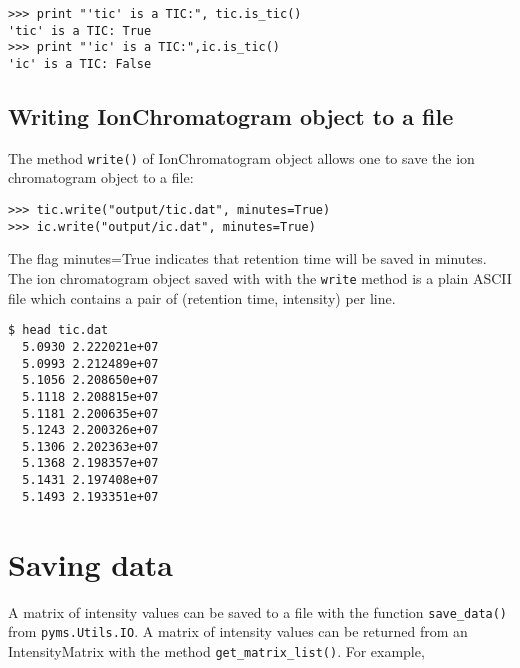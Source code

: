 \begin{verbatim}
>>> print "'tic' is a TIC:", tic.is_tic()
'tic' is a TIC: True
>>> print "'ic' is a TIC:",ic.is_tic()
'ic' is a TIC: False
\end{verbatim}

\subsection{Writing IonChromatogram object to a file}


The method {\tt write()} of IonChromatogram object allows one to save
the ion chromatogram object to a file:

\begin{verbatim}
>>> tic.write("output/tic.dat", minutes=True)
>>> ic.write("output/ic.dat", minutes=True)
\end{verbatim}

\noindent
The flag minutes=True indicates that retention time will be saved in minutes.
The ion chromatogram object saved with with the {\tt write{}} method is a
plain ASCII file which contains a pair of (retention time, intensity) per
line.

\begin{verbatim}
$ head tic.dat
  5.0930 2.222021e+07
  5.0993 2.212489e+07
  5.1056 2.208650e+07
  5.1118 2.208815e+07
  5.1181 2.200635e+07
  5.1243 2.200326e+07
  5.1306 2.202363e+07
  5.1368 2.198357e+07
  5.1431 2.197408e+07
  5.1493 2.193351e+07
\end{verbatim}

%

\section{Saving data}


\noindent
A matrix of intensity values can be saved to a file with the function
{\tt save\_data()} from {\tt pyms.Utils.IO}. A matrix of intensity values can
be returned from an IntensityMatrix with the method {\tt get\_matrix\_list()}.
For example,

